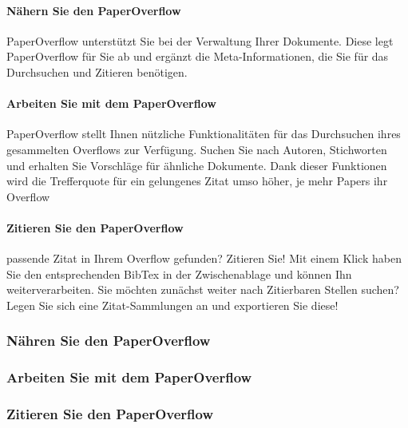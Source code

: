 \documentclass[a4paper,12pt]{article}
\begin{document}
\paragraph{Nähern Sie den PaperOverflow}
PaperOverflow unterstützt Sie bei der Verwaltung Ihrer Dokumente. Diese legt PaperOverflow für Sie ab und ergänzt die Meta-Informationen, die Sie für das Durchsuchen und Zitieren benötigen.

\paragraph{Arbeiten Sie mit dem PaperOverflow}
PaperOverflow stellt Ihnen nützliche Funktionalitäten für das Durchsuchen ihres gesammelten Overflows zur Verfügung. Suchen Sie nach Autoren, Stichworten und erhalten Sie Vorschläge für ähnliche Dokumente. Dank dieser Funktionen wird die Trefferquote für ein gelungenes Zitat umso höher, je mehr Papers ihr Overflow 

\paragraph{Zitieren Sie den PaperOverflow}
passende Zitat in Ihrem Overflow gefunden? Zitieren Sie! Mit einem Klick haben Sie den entsprechenden BibTex in der Zwischenablage und können Ihn weiterverarbeiten. Sie möchten zunächst weiter nach Zitierbaren Stellen suchen? Legen Sie sich eine Zitat-Sammlungen an und exportieren Sie diese!

\pagebreak

\subsubsection{Nähren Sie den PaperOverflow}

\subsubsection{Arbeiten Sie mit dem PaperOverflow}

\subsubsection{Zitieren Sie den PaperOverflow}
\end{document}
